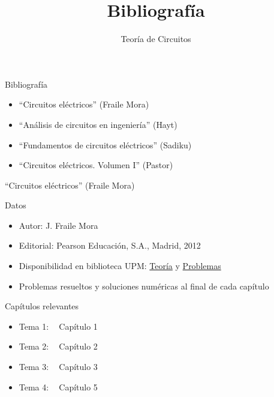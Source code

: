 \documentclass[aspectratio=169, usenames,svgnames,dvipsnames]{beamer}
\date{}
\title{\LARGE Bibliografía \vspace{5mm}}
\subtitle{Teoría de Circuitos}
\begin{document}
\maketitle


\begin{frame}{Bibliografía}
    \begin{itemize}
    \item ``Circuitos eléctricos'' (\alert{Fraile Mora})
    \vspace{3mm}
    \item ``Análisis de circuitos en ingeniería'' (\alert{Hayt})
    \vspace{3mm}
    \item ``Fundamentos de circuitos eléctricos'' (\alert{Sadiku})
    \vspace{3mm}
    \item ``Circuitos eléctricos. Volumen I'' (\alert{Pastor})
    \end{itemize}
\end{frame}


\begin{frame}{``Circuitos eléctricos'' (\alert{Fraile Mora})}
    \begin{block}{Datos}
        \begin{itemize}
        \item Autor: J. Fraile Mora
        \item Editorial: Pearson Educación, S.A., Madrid, 2012
        \item Disponibilidad en biblioteca UPM: \href{https://ingenio.upm.es/primo-explore/fulldisplay?docid=34UPM\_ALMA2150534070004212\&context=L\&vid=34UPM\_VU1\&search\_scope=TAB1\_SCOPE1\&tab=tab1\&lang=es\_ES}{Teoría} y \href{https://ingenio.upm.es/permalink/f/1vo0cl5/34UPM\_ALMA2164586310004212}{Problemas}
        \item Problemas resueltos y soluciones numéricas al final de cada capítulo
        \end{itemize}
    \end{block}

    \begin{block}{Capítulos relevantes}
        \begin{itemize}
        \item Tema 1: $\;\;$ Capítulo 1
        \item Tema 2: $\;\;$ Capítulo 2
        \item Tema 3: $\;\;$ Capítulo 3
        \item Tema 4: $\;\;$ Capítulo 5
        \end{itemize}
    \end{block}
\end{frame}
\end{document}
